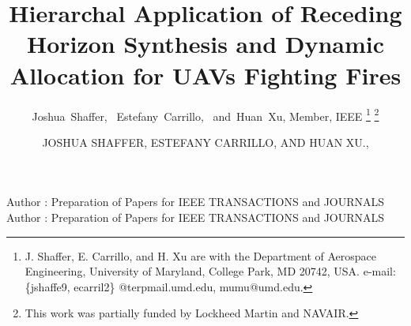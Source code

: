 \documentclass{ieeeaccess}
\begin{document}

\title{Hierarchal Application of Receding Horizon Synthesis and Dynamic Allocation for UAVs Fighting Fires}

\author{Joshua~Shaffer,~
	Estefany~Carrillo,~
	and~Huan~Xu, Member, IEEE%
	\thanks{J. Shaffer, E. Carrillo, and H. Xu are with the Department of Aerospace Engineering,
		University of Maryland, College Park,
		MD 20742, USA. e-mail: \{jshaffe9, ecarril2\} @terpmail.umd.edu, mumu@umd.edu.}
	\thanks{This work was partially funded by Lockheed Martin and NAVAIR.}}%



\author{\uppercase{Joshua Shaffer},
	\uppercase{Estefany Carrillo, and Huan Xu}.,
	}
\address[1]{Department of Aerospace Engineering, University of Maryland, College Park, MD 20742 USA (e-mail: jshaffe9@terpmail.umd.edu)}
\address[2]{Department of Aerospace Engineering, University of Maryland, College Park, MD 20742 USA (e-mail: ecarril2@terpmail.umd.edu)}
\address[3]{Department of Aerospace Engineering, University of Maryland, College Park, MD 20742 USA (e-mail: mumu@umd.edu)}

\markboth
{Author \headeretal: Preparation of Papers for IEEE TRANSACTIONS and JOURNALS}
{Author \headeretal: Preparation of Papers for IEEE TRANSACTIONS and JOURNALS}

\end{document}
